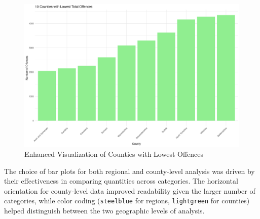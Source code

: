 \documentclass{article}
\begin{document}
\begin{figure}[H]
   \centering
   \includegraphics[width=0.7\linewidth]{Images/Plot6.png}
   \caption{Enhanced Visualization of Counties with Lowest Offences}
   \label{fig:enhanced_county_offences}
\end{figure}

The choice of bar plots for both regional and county-level analysis was driven by their effectiveness in comparing quantities across categories. The horizontal orientation for county-level data improved readability given the larger number of categories, while color coding (\texttt{steelblue} for regions, \texttt{lightgreen} for counties) helped distinguish between the two geographic levels of analysis.

\end{document}
